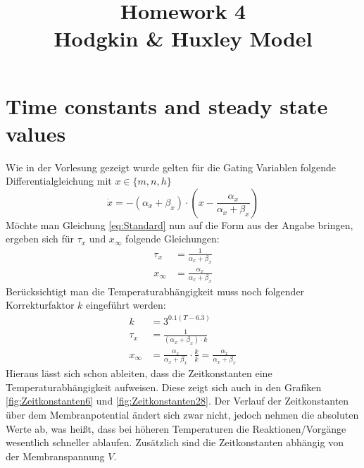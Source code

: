 \documentclass[conference]{IEEEtran}
\begin{document}
%
%
\title{Homework 4\\ Hodgkin \& Huxley Model}

\author{
}


\maketitle

\IEEEpeerreviewmaketitle

\section{Time constants and steady state values}
Wie in der Vorlesung gezeigt wurde gelten für die Gating Variablen folgende Differentialgleichung mit $x \in \{m,n,h\}$
\begin{equation}
	\dot{x} = -(\alpha_x + \beta_x) \cdot \left(x - \frac{\alpha_x}{\alpha_x + \beta_x}\right)
	\label{eq:Standard}
\end{equation}
Möchte man Gleichung \eqref{eq:Standard} nun auf die Form aus der Angabe bringen, ergeben sich für $\tau_x$ und $x_{\infty}$ folgende Gleichungen:
\begin{align}
	\tau_x & = \frac{1}{\alpha_x + \beta_x}\\
	x_{\infty} & = \frac{\alpha_x}{\alpha_x + \beta_x}
\end{align}
Berücksichtigt man die Temperaturabhängigkeit muss noch folgender Korrekturfaktor $k$ eingeführt werden:
\begin{align}
	k & = 3^{0.1 (T-6.3)}\\
	\tau_x & = \frac{1}{(\alpha_x + \beta_x) \cdot k}\\
	x_{\infty} & = \frac{\alpha_x}{\alpha_x + \beta_x} \cdot \frac{k}{k} = \frac{\alpha_x}{\alpha_x + \beta_x}
\end{align}
Hieraus lässt sich schon ableiten, dass die Zeitkonstanten eine Temperaturabhängigkeit aufweisen. Diese zeigt sich auch in den Grafiken \ref{fig:Zeitkonstanten6} und \ref{fig:Zeitkonstanten28}. Der Verlauf der Zeitkonstanten über dem Membranpotential ändert sich zwar nicht, jedoch nehmen die absoluten Werte ab, was heißt, dass bei höheren Temperaturen die Reaktionen/Vorgänge wesentlich schneller ablaufen. Zusätzlich sind die Zeitkonstanten abhängig von der Membranspannung $V$.
\end{document}
